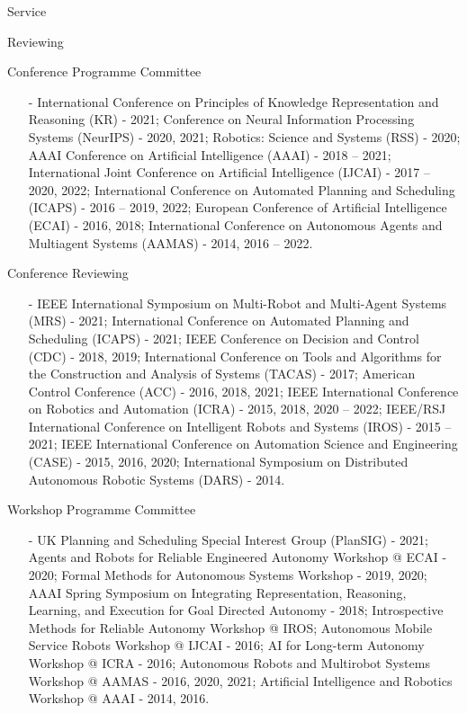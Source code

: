 \begin{rSection}{Service}
\begin{rSubsection}{Reviewing}{}{}{}
\item{Conference Programme Committee}
\begin{itemize}
\vspace*{-0.2cm}
\item[-]  International Conference on Principles of Knowledge Representation and Reasoning (KR) - 2021; Conference on Neural Information Processing Systems (NeurIPS) - 2020, 2021; Robotics: Science and Systems (RSS) - 2020; AAAI Conference on Artificial Intelligence (AAAI) - 2018 -- 2021; International Joint Conference on Artificial Intelligence (IJCAI) - 2017 -- 2020, 2022; International Conference on Automated Planning and Scheduling (ICAPS) - 2016 -- 2019, 2022;  European Conference of Artificial Intelligence (ECAI) - 2016, 2018; International Conference on Autonomous Agents and Multiagent Systems (AAMAS) - 2014, 2016 -- 2022.
\end{itemize}

\item{Conference Reviewing}
\begin{itemize}
\vspace*{-0.2cm}
\item[-]  IEEE International Symposium on Multi-Robot and Multi-Agent Systems (MRS) - 2021; International Conference on Automated Planning and Scheduling (ICAPS) - 2021; IEEE Conference on Decision and Control (CDC) - 2018, 2019; International Conference on Tools and Algorithms for the Construction and Analysis of Systems (TACAS) - 2017; American Control Conference (ACC) - 2016, 2018, 2021; IEEE International Conference on Robotics and Automation (ICRA) - 2015, 2018, 2020 -- 2022; IEEE/RSJ International Conference on Intelligent Robots and Systems (IROS) - 2015 -- 2021; IEEE International Conference on Automation Science and Engineering (CASE) - 2015, 2016, 2020;  International Symposium on Distributed Autonomous Robotic Systems (DARS) - 2014.
\end{itemize}


\item{Workshop Programme Committee}
\begin{itemize}
\vspace*{-0.2cm}
\item[-] UK Planning and Scheduling Special Interest Group (PlanSIG) - 2021; Agents and Robots for Reliable Engineered Autonomy Workshop @ ECAI - 2020; Formal Methods for Autonomous Systems Workshop - 2019, 2020;  AAAI Spring Symposium on Integrating Representation, Reasoning, Learning, and Execution for Goal Directed Autonomy - 2018; Introspective Methods for Reliable Autonomy Workshop @ IROS; Autonomous Mobile Service Robots Workshop @ IJCAI - 2016; AI for Long-term Autonomy Workshop @ ICRA - 2016; Autonomous Robots and Multirobot Systems Workshop @ AAMAS - 2016, 2020, 2021; Artificial Intelligence and Robotics Workshop  @ AAAI - 2014, 2016.
\end{itemize}
\end{rSubsection}





\end{rSection}
